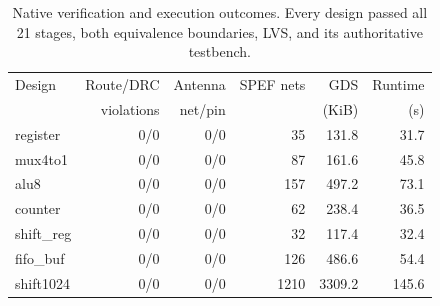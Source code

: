 \begin{table}[htbp]\centering\small\setlength{\tabcolsep}{4pt}
\caption{Native verification and execution outcomes. Every design passed all 21 stages, both equivalence boundaries, LVS, and its authoritative testbench.}\label{tab:gates}
\begin{tabular}{@{}lrrrrr@{}}\toprule
Design & Route/DRC & Antenna & SPEF nets & GDS & Runtime \\
 & violations & net/pin & & (KiB) & (s) \\
\midrule
register & 0/0 & 0/0 & 35 & 131.8 & 31.7 \\
mux4to1 & 0/0 & 0/0 & 87 & 161.6 & 45.8 \\
alu8 & 0/0 & 0/0 & 157 & 497.2 & 73.1 \\
counter & 0/0 & 0/0 & 62 & 238.4 & 36.5 \\
shift\_reg & 0/0 & 0/0 & 32 & 117.4 & 32.4 \\
fifo\_buf & 0/0 & 0/0 & 126 & 486.6 & 54.4 \\
shift1024 & 0/0 & 0/0 & 1210 & 3309.2 & 145.6 \\
\bottomrule\end{tabular}\end{table}
